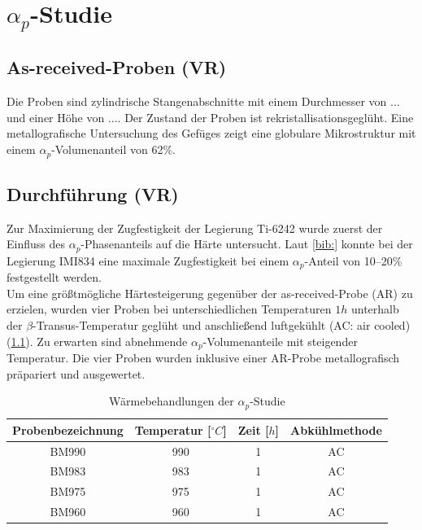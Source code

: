 \chapter{$\alpha_p$-Studie}

\section{As-received-Proben (VR)}
Die Proben sind zylindrische Stangenabschnitte mit einem Durchmesser von {...} und einer Höhe von {...}. Der Zustand der Proben ist rekristallisationsgeglüht. Eine metallografische Untersuchung des Gefüges zeigt eine globulare Mikrostruktur mit einem $\alpha_p$-Volumenanteil von 62\%. 

\section{Durchführung (VR)}

Zur Maximierung der Zugfestigkeit der Legierung Ti-6242 wurde zuerst der Einfluss des $\alpha_p$-Phasenanteils auf die Härte untersucht. Laut \ref{bib:} konnte bei der Legierung IMI834 eine maximale Zugfestigkeit bei einem $\alpha_p$-Anteil von 10--20\% festgestellt werden. \\
Um eine größtmögliche Härtesteigerung gegenüber der as-received-Probe (AR) zu erzielen, wurden vier Proben bei unterschiedlichen Temperaturen $1h$ unterhalb der $\beta$-Transus-Temperatur geglüht und anschließend luftgekühlt (AC: air cooled) (\ref{tab:alphap}). Zu erwarten sind abnehmende $\alpha_p$-Volumenanteile mit steigender Temperatur. Die vier Proben wurden inklusive einer AR-Probe metallografisch präpariert und ausgewertet.



\begin{table}[h]
	\centering
	\begin{tabular}{|c|c|c|c|}
		\hline 
		Probenbezeichnung & Temperatur [$^\circ C$] & Zeit [$h$] & Abkühlmethode \\ 
		\hline 
		BM990 & 990 & 1 & AC\\ 
		\hline 
		BM983 & 983 & 1 & AC\\
		\hline
		BM975 & 975 & 1 & AC\\ 
		\hline
		BM960 & 960 & 1 & AC\\ 
		\hline 
	\end{tabular} 
	\caption{Wärmebehandlungen der $\alpha_p$-Studie}
	\label{tab:alphap}
\end{table}





